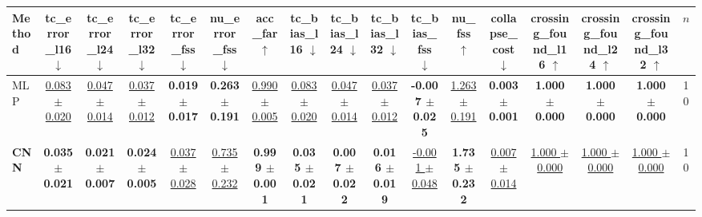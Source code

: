 \begin{tabular}{lcccccccccccccccc}
\toprule
Method & tc\_error\_l16 $\downarrow$ & tc\_error\_l24 $\downarrow$ & tc\_error\_l32 $\downarrow$ & tc\_error\_fss $\downarrow$ & nu\_error\_fss $\downarrow$ & acc\_far $\uparrow$ & tc\_bias\_l16 $\downarrow$ & tc\_bias\_l24 $\downarrow$ & tc\_bias\_l32 $\downarrow$ & tc\_bias\_fss $\downarrow$ & nu\_fss $\uparrow$ & collapse\_cost $\downarrow$ & crossing\_found\_l16 $\uparrow$ & crossing\_found\_l24 $\uparrow$ & crossing\_found\_l32 $\uparrow$ & $n$ \\
\midrule
MLP & \underline{0.083 $\pm$ 0.020} & \underline{0.047 $\pm$ 0.014} & \underline{0.037 $\pm$ 0.012} & \textbf{0.019 $\pm$ 0.017} & \textbf{0.263 $\pm$ 0.191} & \underline{0.990 $\pm$ 0.005} & \underline{0.083 $\pm$ 0.020} & \underline{0.047 $\pm$ 0.014} & \underline{0.037 $\pm$ 0.012} & \textbf{-0.007 $\pm$ 0.025} & \underline{1.263 $\pm$ 0.191} & \textbf{0.003 $\pm$ 0.001} & \textbf{1.000 $\pm$ 0.000} & \textbf{1.000 $\pm$ 0.000} & \textbf{1.000 $\pm$ 0.000} & 10 \\
\textbf{CNN} & \textbf{0.035 $\pm$ 0.021} & \textbf{0.021 $\pm$ 0.007} & \textbf{0.024 $\pm$ 0.005} & \underline{0.037 $\pm$ 0.028} & \underline{0.735 $\pm$ 0.232} & \textbf{0.999 $\pm$ 0.001} & \textbf{0.035 $\pm$ 0.021} & \textbf{0.007 $\pm$ 0.022} & \textbf{0.016 $\pm$ 0.019} & \underline{-0.001 $\pm$ 0.048} & \textbf{1.735 $\pm$ 0.232} & \underline{0.007 $\pm$ 0.014} & \underline{1.000 $\pm$ 0.000} & \underline{1.000 $\pm$ 0.000} & \underline{1.000 $\pm$ 0.000} & 10 \\
\bottomrule
\end{tabular}
